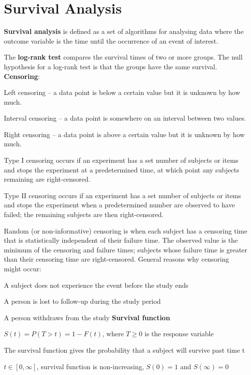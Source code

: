 \documentclass[12pt]{article}
\begin{document}
\section{Survival Analysis}
\par \textbf{Survival analysis} is defined as a set of algorithms for analysing data where the outcome variable is the time until the occurrence of an event of interest.
\par The \textbf{log-rank test} compares the survival times of two or more groups. The null hypothesis for a log-rank test is that the groups have the same survival.
\\
\textbf{Censoring}:
\ulb
\item Left censoring – a data point is below a certain value but it is unknown by how much.
\item Interval censoring – a data point is somewhere on an interval between two values.
\item Right censoring – a data point is above a certain value but it is unknown by how much.
\item Type I censoring occurs if an experiment has a set number of subjects or items and stops the experiment at a predetermined time, at which point any subjects remaining are right-censored.
\item Type II censoring occurs if an experiment has a set number of subjects or items and stops the experiment when a predetermined number are observed to have failed; the remaining subjects are then right-censored.
\item Random (or non-informative) censoring is when each subject has a censoring time that is statistically independent of their failure time. The observed value is the minimum of the censoring and failure times; subjects whose failure time is greater than their censoring time are right-censored.
\ule
General reasons why censoring might occur:
\ulb
\item A subject does not experience the event before the study ends
\item A person is lost to follow-up during the study period
\item A person withdraws from the study
\ule
\textbf{Survival function}
\ulb
\item $S(t) = P(T>t) = 1 - F(t)$, where $T \geq 0 $ is the response variable
\item The survival function gives the probability that a subject will survive past time t
\item $t \in [0, \infty]$, survival function is non-increasing, $S(0) = 1$ and $S(\infty) = 0$
\end{document}
